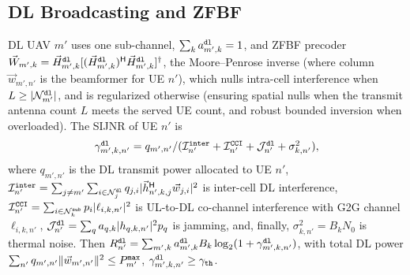 \documentclass[journal]{IEEEtran}
\begin{document}
\subsection{DL Broadcasting and ZFBF}
\label{sec:dl}
DL UAV $m'$ uses one sub-channel, $\sum_k a_{m',k}^{\tt dl}=1$, and ZFBF precoder $\vec{W}_{m',k}=\vec{H}_{m',k}^{\tt dl}[(\vec{H}_{m',k}^{\tt dl})^{\sf H}\vec{H}_{m',k}^{\tt dl}]^{\dagger}$, the Moore--Penrose inverse {(where column $\vec{w}_{m',n'}$ is the beamformer for UE $n'$)}, which nulls intra-cell interference when $L\ge|\mathcal{N}_{m'}^{\tt dl}|$, and is regularized otherwise {\color{blue}(ensuring spatial nulls when the transmit antenna count $L$ meets the served UE count, and robust bounded inversion when overloaded)}. The SIJNR of UE $n'$ is
\begin{equation}
\textstyle\gamma_{m',k,n'}^{\tt dl}=q_{m',n'}/(\mathcal{I}_{n'}^{\tt inter}+\mathcal{I}_{n'}^{\tt CCI}+\mathcal{J}_{n'}^{\tt dl}+\sigma_{k,n'}^2),
\label{eq:dl_sijnr}
\end{equation}
where {$q_{m',n'}$ is the DL transmit power allocated to UE $n'$}, $\mathcal{I}_{n'}^{\tt inter}=\sum_{j\neq m'}\sum_{i\in\mathcal{N}_j^{\tt dl}}q_{j,i}|\vec{h}_{n',k,j}^{\sf H}{\vec{w}_{j,i}}|^2$ is inter-cell DL interference,
$\mathcal{I}_{n'}^{\tt CCI}=\sum_{i\in\mathcal{N}_k^{\tt sub}}p_i|\ell_{i,k,n'}|^2$ is UL-to-DL co-channel interference with G2G channel $\ell_{i,k,n'}$,
$\mathcal{J}_{n'}^{\tt dl}=\sum_{q}a_{q,k}|h_{q,k,n'}|^2 p_q$ is jamming, and, finally,
$\sigma_{k,n'}^2=B_k N_0$ is thermal noise.
Then $R_{n'}^{\tt dl}=\sum_{m',k}a_{m',k}^{\tt dl}B_k\log_2(1+\gamma_{m',k,n'}^{\tt dl})$, with total DL power $\sum_{n'}q_{m',n'}\Vert\vec{w}_{m',n'}\Vert^2\le P_{m'}^{\tt max}$, $\gamma_{m',k,n'}^{\tt dl}\ge\gamma_{\tt th}$.
\end{document}
